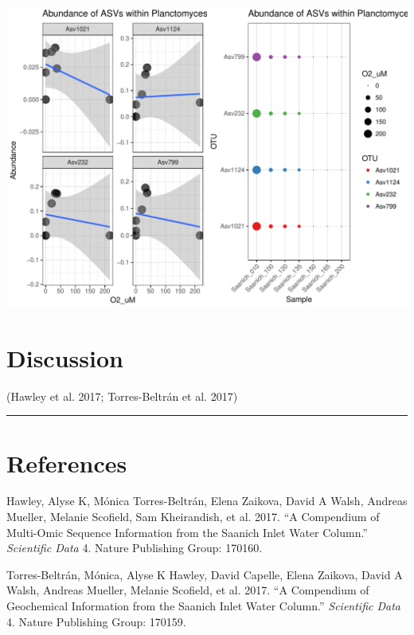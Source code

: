 \documentclass[11 pt,]{article}
\begin{document}
\includegraphics{Figs/unnamed-chunk-17-1.pdf}

\section{Discussion}\label{discussion}

(Hawley et al. 2017; Torres-Beltrán et al. 2017)

\begin{center}\rule{0.5\linewidth}{\linethickness}\end{center}

\section*{References}\label{references}

\hypertarget{refs}{}
\hypertarget{ref-Hawley2017:compendium}{}
Hawley, Alyse K, Mónica Torres-Beltrán, Elena Zaikova, David A Walsh,
Andreas Mueller, Melanie Scofield, Sam Kheirandish, et al. 2017. ``A
Compendium of Multi-Omic Sequence Information from the Saanich Inlet
Water Column.'' \emph{Scientific Data} 4. Nature Publishing Group:
170160.

\hypertarget{ref-Torres2017:compendium}{}
Torres-Beltrán, Mónica, Alyse K Hawley, David Capelle, Elena Zaikova,
David A Walsh, Andreas Mueller, Melanie Scofield, et al. 2017. ``A
Compendium of Geochemical Information from the Saanich Inlet Water
Column.'' \emph{Scientific Data} 4. Nature Publishing Group: 170159.
\end{document}
